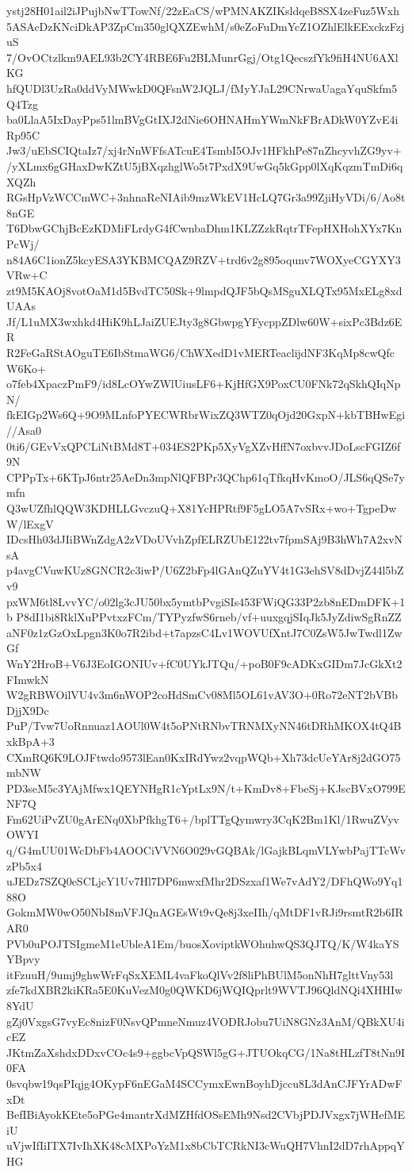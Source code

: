 ystj28H01ail2iJPujbNwTTowNf/22zEaCS/wPMNAKZIKsldqeB8SX4zeFuz5Wxh
5ASAcDzKNciDkAP3ZpCm350glQXZEwhM/s0eZoFuDmYcZ1OZhlElkEExckzFzjuS
7/OvOCtzlkm9AEL93b2CY4RBE6Fu2BLMunrGgj/Otg1QecszfYk9fiH4NU6AXlKG
hfQUDl3UzRa0ddVyMWwkD0QFsnW2JQLJ/fMyYJaL29CNrwaUagaYquSkfm5Q4Tzg
ba0LlaA5IxDayPps51lmBVgGtIXJ2dNie6OHNAHmYWmNkFBrADkW0YZvE4iRp95C
Jw3/uEbSCIQtaIz7/xj4rNnWFfsATcuE4TsmbI5OJv1HFkhPe87nZhcyvhZG9yv+
/yXLmx6gGHaxDwKZtU5jBXqzhglWo5t7PxdX9UwGq5kGpp0lXqKqzmTmDi6qXQZh
RGsHpVzWCCmWC+3nhnaReNIAib9mzWkEV1HcLQ7Gr3a99ZjiHyVDi/6/Ao8t8nGE
T6DbwGChjBcEzKDMiFLrdyG4fCwnbaDhm1KLZZzkRqtrTFepHXHohXYx7KnPcWj/
n84A6C1ionZ5kcyESA3YKBMCQAZ9RZV+trd6v2g895oqunv7WOXyeCGYXY3VRw+C
zt9M5KAOj8votOaM1d5BvdTC50Sk+9lmpdQJF5bQsMSguXLQTx95MxELg8xdUAAs
Jf/L1uMX3wxhkd4HiK9hLJaiZUEJty3g8GbwpgYFycppZDlw60W+sixPc3Bdz6ER
R2FeGaRStAOguTE6IbStmaWG6/ChWXedD1vMERTeaclijdNF3KqMp8cwQfcW6Ko+
o7feb4XpaczPmF9/id8LcOYwZWlUiusLF6+KjHfGX9PoxCU0FNk72qSkhQIqNpN/
fkEIGp2Ws6Q+9O9MLnfoPYECWRbrWixZQ3WTZ0qOjd20GxpN+kbTBHwEgi//Asa0
0ti6/GEvVxQPCLiNtBMd8T+034ES2PKp5XyVgXZvHffN7oxbvvJDoLscFGIZ6f9N
CPPpTx+6KTpJ6ntr25AeDn3mpNlQFBPr3QChp61qTfkqHvKmoO/JLS6qQSe7ymfn
Q3wUZfhlQQW3KDHLLGvczuQ+X81YcHPRtf9F5gLO5A7vSRx+wo+TgpeDwW/lExgV
IDcsHh03dJIiBWnZdgA2zVDoUVvhZpfELRZUbE122tv7fpmSAj9B3hWh7A2xvNsA
p4avgCVuwKUz8GNCR2c3iwP/U6Z2bFp4lGAnQZuYV4t1G3ehSV8dDvjZ44l5bZv9
pxWM6tl8LvvYC/o02lg3cJU50bx5ymtbPvgiSIs453FWiQG33P2zb8nEDmDFK+1b
P8dI1bi8RklXuPPvtxzFCm/TYPyzfwS6rneb/vf+uuxgqjSIqJk5JyZdiwSgRnZZ
aNF0z1zGzOxLpgn3K0o7R2ibd+t7apzsC4Lv1WOVUfXntJ7C0ZsW5JwTwdl1ZwGf
WnY2HroB+V6J3EoIGONIUv+fC0UYkJTQu/+poB0F9cADKxGIDm7JcGkXt2FImwkN
W2gRBWOilVU4v3m6nWOP2coHdSmCv08Ml5OL61vAV3O+0Ro72eNT2bVBbDjjX9Dc
PuP/Tvw7UoRnnuaz1AOUl0W4t5oPNtRNbvTRNMXyNN46tDRhMKOX4tQ4BxkBpA+3
CXmRQ6K9LOJFtwdo9573lEan0KxIRdYwz2vqpWQb+Xh73dcUeYAr8j2dGO75mbNW
PD3seM5c3YAjMfwx1QEYNHgR1cYptLx9N/t+KmDv8+FbeSj+KJscBVxO799ENF7Q
Fm62UiPvZU0gArENq0XbPfkhgT6+/bplTTgQymwry3CqK2Bm1Kl/1RwuZVyvOWYI
q/G4mUU01WcDbFb4AOOCiVVN6O029vGQBAk/lGajkBLqmVLYwbPajTTcWvzPb5x4
uJEDz7SZQ0eSCLjcY1Uv7Hl7DP6mwxfMhr2DSzxaf1We7vAdY2/DFhQWo9Yq188O
GokmMW0wO50NbI8mVFJQnAGEsWt9vQe8j3xeIIh/qMtDF1vRJi9rsmtR2b6IRAR0
PVb0uPOJTSIgmeM1eUbleA1Em/buosXoviptkWOhuhwQS3QJTQ/K/W4kaYSYBpvy
itFzuuH/9umj9ghwWrFqSxXEML4vaFkoQlVv2f8liPhBUlM5onNhH7glttVny53l
zfe7kdXBR2kiKRa5E0KuVezM0g0QWKD6jWQIQprlt9WVTJ96QldNQi4XHHIw8YdU
gZj0VxgsG7vyEc8nizF0NsvQPmneNmuz4VODRJobu7UiN8GNz3AnM/QBkXU4icEZ
JKtmZaXshdxDDxvCOc4s9+ggbcVpQSWl5gG+JTUOkqCG/1Na8tHLzfT8tNn9I0FA
0svqbw19qsPIqjg4OKypF6nEGaM4SCCymxEwnBoyhDjccu8L3dAnCJFYrADwFxDt
BefIBiAyokKEte5oPGe4mantrXdMZHfdOSsEMh9Nsd2CVbjPDJVxgx7jWHefMEiU
uVjwIfIiITX7IvIhXK48cMXPoYzM1x8bCbTCRkNI3cWuQH7VhnI2dD7rhAppqYHG
